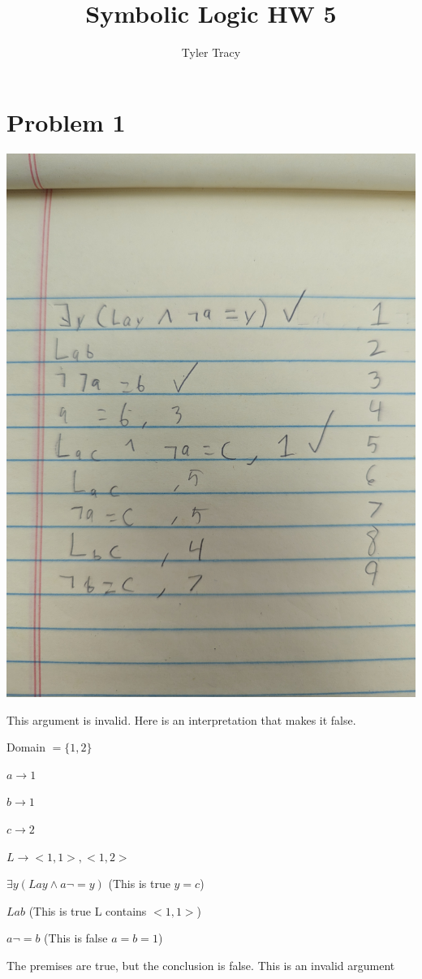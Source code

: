\documentclass[12pt]{article}
\title{Symbolic Logic HW 5}
\author{Tyler Tracy}
\begin{document}
\section*{Problem 1}

\includegraphics[width=\textwidth]{1}

This argument is invalid. Here is an interpretation that makes it false. 

Domain $ = \{1, 2\}$

$a \rightarrow 1$

$b \rightarrow 1$

$c \rightarrow 2$

$L \rightarrow {<1, 1>, <1, 2>}$


$\exists y (Lay \land a \lnot = y)$ (This is true $y = c$)

$Lab$ (This is true L contains $<1, 1>$)

$a \lnot = b$ (This is false $a = b = 1$)

The premises are true, but the conclusion is false. This is an invalid argument
\end{document}
